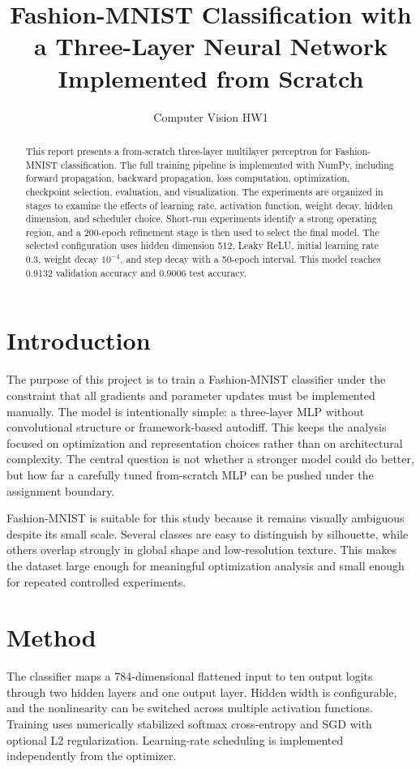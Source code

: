 \documentclass[10pt,twocolumn]{article}
\title{\textbf{Fashion-MNIST Classification with a Three-Layer Neural Network Implemented from Scratch}}
\author{Computer Vision HW1}
\date{}
\begin{document}
\maketitle

\begin{abstract}
This report presents a from-scratch three-layer multilayer perceptron for Fashion-MNIST classification. The full training pipeline is implemented with NumPy, including forward propagation, backward propagation, loss computation, optimization, checkpoint selection, evaluation, and visualization. The experiments are organized in stages to examine the effects of learning rate, activation function, weight decay, hidden dimension, and scheduler choice. Short-run experiments identify a strong operating region, and a 200-epoch refinement stage is then used to select the final model. The selected configuration uses hidden dimension 512, Leaky ReLU, initial learning rate 0.3, weight decay $10^{-4}$, and step decay with a 50-epoch interval. This model reaches 0.9132 validation accuracy and 0.9006 test accuracy.
\end{abstract}

\section{Introduction}
The purpose of this project is to train a Fashion-MNIST classifier under the constraint that all gradients and parameter updates must be implemented manually. The model is intentionally simple: a three-layer MLP without convolutional structure or framework-based autodiff. This keeps the analysis focused on optimization and representation choices rather than on architectural complexity. The central question is not whether a stronger model could do better, but how far a carefully tuned from-scratch MLP can be pushed under the assignment boundary.

Fashion-MNIST is suitable for this study because it remains visually ambiguous despite its small scale. Several classes are easy to distinguish by silhouette, while others overlap strongly in global shape and low-resolution texture. This makes the dataset large enough for meaningful optimization analysis and small enough for repeated controlled experiments.

\section{Method}
The classifier maps a 784-dimensional flattened input to ten output logits through two hidden layers and one output layer. Hidden width is configurable, and the nonlinearity can be switched across multiple activation functions. Training uses numerically stabilized softmax cross-entropy and SGD with optional L2 regularization. Learning-rate scheduling is implemented independently from the optimizer.
\end{document}

